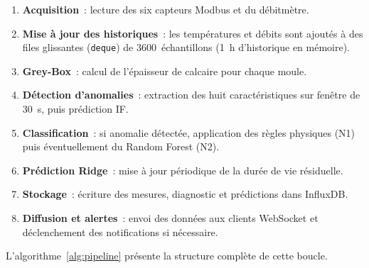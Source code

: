 \begin{enumerate}
  \item \textbf{Acquisition}~: lecture des six capteurs Modbus et du débitmètre.
  \item \textbf{Mise à jour des historiques}~: les températures et débits sont ajoutés à des files glissantes (\texttt{deque}) de 3600~échantillons (1~h d'historique en mémoire).
  \item \textbf{Grey-Box}~: calcul de l'épaisseur de calcaire pour chaque moule.
  \item \textbf{Détection d'anomalies}~: extraction des huit caractéristiques sur fenêtre de 30~s, puis prédiction IF.
  \item \textbf{Classification}~: si anomalie détectée, application des règles physiques (N1) puis éventuellement du Random Forest (N2).
  \item \textbf{Prédiction Ridge}~: mise à jour périodique de la durée de vie résiduelle.
  \item \textbf{Stockage}~: écriture des mesures, diagnostic et prédictions dans InfluxDB.
  \item \textbf{Diffusion et alertes}~: envoi des données aux clients WebSocket et déclenchement des notifications si nécessaire.
\end{enumerate}

L'algorithme~\ref{alg:pipeline} présente la structure complète de cette boucle.

